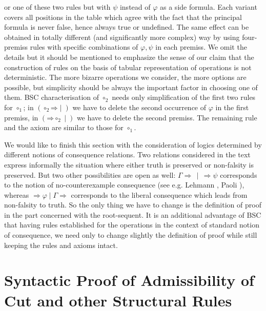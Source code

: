 \documentclass[11pt,a4paper,titlepage]{article}
\theoremstyle{definition}
\newcommand{\3}{\vspace{.3in}}
\newcommand{\2}{\vspace{.2in}}
\newcommand{\1}{\vspace{.1in}}
\newcommand{\5}{\vspace{.05in}}
\begin{document}
or one of these two rules but with $\psi$ instead of $\varphi$ as a side formula. Each variant covers all positions in the table which agree with the fact that the principal formula is never false, hence always true or undefined. The same effect can be obtained in totally different (and significantly more complex) way by using four-premiss rules with specific combinations of $\varphi, \psi$ in each premiss. We omit the details but it should be mentioned to emphasize the sense of our claim that the construction of rules on the basis of tabular representation of operations is not deterministic. The more bizarre operations we consider, the more options are possible, but simplicity should be always the important factor in choosing one of them. BSC characterisation of $\circ_2$ needs only simplification of the first two rules for $\circ_1$; in $(\mathord{\circ_2}\mathord{\Rightarrow}\mid)$ we have to delete the second occurrence of $\varphi$ in the first premiss, in $(\mathord{\Rightarrow}\mathord{\circ_2}\mid)$ we have to delete the second premiss. The remaining rule and the axiom are similar to those for $\circ_1$.

\1

We would like to finish this section with the consideration of
logics determined by different notions of consequence relations. Two relations considered in the text express informally the situation where either truth is preserved or non-falsity is preserved. But two other possibilities are open as well: $\Gamma\Rightarrow\,\mid\, \Rightarrow\psi$ corresponds to the notion of no-counterexample consequence (see e.g. Lehmann \cite{Lehmann}, Paoli \cite{Paoli}), whereas $\Rightarrow \varphi \mid  \Gamma\Rightarrow$ corresponds to the liberal consequence which leads from non-falsity to truth. So the only thing we have to change is the definition of proof in the part concerned with the root-sequent. 
It is an additional advantage of BSC that having rules established for the operations in the context of standard notion of consequence, we need only to change slightly the definition of proof while still keeping the rules and axioms intact.

\section{Syntactic Proof of Admissibility of Cut and other Structural Rules}\label{Syntactic}
\end{document}
